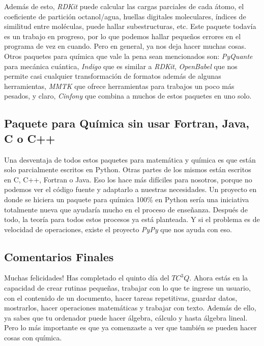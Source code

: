 \documentclass[10pt,letterpaper]{article}
\begin{document}
Adem\'as de esto, \emph{RDKit} puede calcular las cargas parciales de cada \'atomo, el coeficiente de partici\'on octanol/agua, huellas digitales moleculares, \'indices de similitud entre mol\'eculas, puede hallar subestructuras, etc. Este paquete todav\'ia es un trabajo en progreso, por lo que podemos hallar peque\~nos errores en el programa de vez en cuando. Pero en general, ya nos deja hacer muchas cosas.\\

Otros paquetes para qu\'imica que vale la pena sean mencionados son: \emph{PyQuante} para mec\'anica cu\'antica, \emph{Indigo} que es similar a \emph{RDKit}, \emph{OpenBabel} que nos permite casi cualquier transformaci\'on de formatos adem\'as de algunas herramientas, \emph{MMTK} que ofrece herramientas para trabajos un poco m\'as pesados, y claro, \emph{Cinfony} que combina a muchos de estos paquetes en uno solo.

\subsection{Paquete para Qu\'imica sin usar Fortran, Java, C o C++}
Una desventaja de todos estos paquetes para matem\'atica y qu\'imica es que est\'an solo parcialmente escritos en Python. Otras partes de los mismos est\'an escritos en C, C++, Fortran o Java. Eso los hace m\'as dif\'iciles para nosotros, porque no podemos ver el c\'odigo fuente y adaptarlo a nuestras necesidades. Un proyecto en donde se hiciera un paquete para qu\'imica 100\% en Python ser\'ia una iniciativa totalmente nueva que ayudar\'ia mucho en el proceso de ense\~nanza. Despu\'es de todo, la teor\'ia para todos estos procesos ya est\'a planteada. Y si el problema es de velocidad de operaciones, existe el proyecto \emph{PyPy} que nos ayuda con eso.

\subsection{Comentarios Finales}
Muchas felicidades! Has completado el quinto d\'ia del $TC^3 Q$. Ahora est\'as en la capacidad de crear rutinas peque\~nas, trabajar con lo que te ingrese un usuario, con el contenido de un documento, hacer tareas repetitivas, guardar datos, mostrarlos, hacer operaciones matem\'aticas y trabajar con texto. Adem\'as de ello, ya sabes que tu ordenador puede hacer \'algebra, c\'alculo y hasta \'algebra lineal. Pero lo m\'as importante es que ya comenzaste a ver que tambi\'en se pueden hacer cosas con qu\'imica.\\
\end{document}
